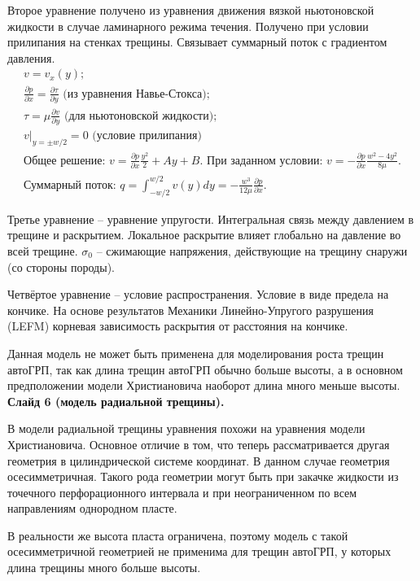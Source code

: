 \documentclass[a4paper, 12pt]{article}
\newcommand{\beq}{\begin{equation}}
\newcommand{\eeq}{\end{equation}}
\begin{document}
Второе уравнение получено из уравнения движения вязкой ньютоновской жидкости в случае ламинарного режима течения.
Получено при условии прилипания на стенках трещины.
Связывает суммарный поток с градиентом давления.
\beq
\begin{gathered}
v=v_x(y);\\
\frac{\partial p}{\partial x}=\frac{\partial\tau}{\partial y}\text{ (из уравнения Навье-Стокса)};\\
\tau=\mu\frac{\partial v}{\partial y}\text{ (для ньютоновской жидкости)};\\
v|_{y=\pm w/2}=0\text{ (условие прилипания)}\\
\text{Общее решение: }v=\frac{\partial p}{\partial x}\frac{y^2}{2}+Ay+B.\text{ При заданном условии: }v=-\frac{\partial p}{\partial x}\frac{w^2-4y^2}{8\mu}.\\
\text{Суммарный поток: }q=\int_{-w/2}^{w/2}{v(y)}dy=-\frac{w^3}{12\mu}\frac{\partial p}{\partial x}.
\end{gathered}
\eeq


Третье уравнение -- уравнение упругости.
Интегральная связь между давлением в трещине и раскрытием.
Локальное раскрытие влияет глобально на давление во всей трещине.
$\sigma_0$ -- сжимающие напряжения, действующие на трещину снаружи (со стороны породы).

Четвёртое уравнение -- условие распространения.
Условие в виде предела на кончике.
На основе результатов Механики Линейно-Упругого разрушения (LEFM) корневая зависимость раскрытия от расстояния на кончике.

Данная модель не может быть применена для моделирования роста трещин автоГРП, так как длина трещин автоГРП обычно больше высоты, а в основном предположении модели Христиановича наоборот длина много меньше высоты.\\

\textbf{Слайд 6 (модель радиальной трещины).}

В модели радиальной трещины уравнения похожи на уравнения модели Христиановича.
Основное отличие в том, что теперь рассматривается другая геометрия в цилиндрической системе координат.
В данном случае геометрия осесимметричная.
Такого рода геометрии могут быть при закачке жидкости из точечного перфорационного интервала и при неограниченном по всем направлениям однородном пласте.

В реальности же высота пласта ограничена, поэтому модель с такой осесимметричной геометрией не применима для трещин автоГРП, у которых длина трещины много больше высоты.
\end{document}
